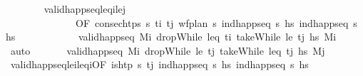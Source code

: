 \begin{isabellebody}
\ \ \ \ \ \ \isamarkupfalse%
\ valid{\isacharunderscore}{\kern0pt}happ{\isacharunderscore}{\kern0pt}seq{\isacharunderscore}{\kern0pt}leq\isactrlsub i{\isacharunderscore}{\kern0pt}le\isactrlsub j\isanewline
\ \ \ \ \ \ \ \ \ \ \ \ \ \ {\isacharbrackleft}{\kern0pt}OF\ {\isacartoucheopen}consec{\isacharunderscore}{\kern0pt}htps\ {\isasympi}s\ t\isactrlsub i\ t\isactrlsub j{\isacartoucheclose}\ {\isacartoucheopen}wf{\isacharunderscore}{\kern0pt}plan\ {\isasympi}s{\isacartoucheclose}\ {\isacartoucheopen}ind{\isacharunderscore}{\kern0pt}happ{\isacharunderscore}{\kern0pt}seq\ {\isasympi}s\ hs\ {\isacartoucheopen}ind{\isacharunderscore}{\kern0pt}happ{\isacharunderscore}{\kern0pt}seq\ {\isasympi}s\ hs\isanewline
\ \ \ \ \ \ \ \ \ \ \ \ {\isacartoucheopen}valid{\isacharunderscore}{\kern0pt}happ{\isacharunderscore}{\kern0pt}seq\ M\isactrlsub i\ {\isacharparenleft}{\kern0pt}dropWhile\ {\isacharparenleft}{\kern0pt}leq\ t\isactrlsub i{\isacharparenright}{\kern0pt}\ {\isacharparenleft}{\kern0pt}takeWhile\ {\isacharparenleft}{\kern0pt}le\ t\isactrlsub j{\isacharparenright}{\kern0pt}\ hs\ M\isactrlsub i{\isacharprime}{\kern0pt}{\isacartoucheclose}\ \isamarkupfalse%
\ auto\isanewline
\ \ \ \ \isamarkupfalse%
\ {}{\isacharcolon}{\kern0pt}\ {\isachardoublequoteopen}valid{\isacharunderscore}{\kern0pt}happ{\isacharunderscore}{\kern0pt}seq\ M\isactrlsub i{\isacharprime}{\kern0pt}\ {\isacharparenleft}{\kern0pt}dropWhile\ {\isacharparenleft}{\kern0pt}le\ t\isactrlsub j{\isacharparenright}{\kern0pt}\ {\isacharparenleft}{\kern0pt}takeWhile\ {\isacharparenleft}{\kern0pt}leq\ t\isactrlsub j{\isacharparenright}{\kern0pt}\ hs\ M\isactrlsub j{\isachardoublequoteclose}\isanewline
\ \ \ \ \ \ \isamarkupfalse%
\ valid{\isacharunderscore}{\kern0pt}happ{\isacharunderscore}{\kern0pt}seq{\isacharunderscore}{\kern0pt}le\isactrlsub i{\isacharunderscore}{\kern0pt}leq\isactrlsub i{\isacharbrackleft}{\kern0pt}OF\ {\isacartoucheopen}is{\isacharunderscore}{\kern0pt}htp\ {\isasympi}s\ t\isactrlsub j{\isacartoucheclose}\ {\isacartoucheopen}ind{\isacharunderscore}{\kern0pt}happ{\isacharunderscore}{\kern0pt}seq\ {\isasympi}s\ hs\ {\isacartoucheopen}ind{\isacharunderscore}{\kern0pt}happ{\isacharunderscore}{\kern0pt}seq\ {\isasympi}s\ hs\isanewline

\end{isabellebody}
